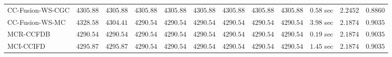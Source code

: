 \begin{table}[H]
\begin{tabular}{lrrrrrrrrrrr}
    CC-Fusion-WS-CGC & $      4305.88$ & $      4305.88$ & $      4305.88$ & $      4305.88$ & $      4305.88$ & $      4305.88$ & $      4305.88$ & $      4305.88$ & $         0.58$ sec    & $       2.2452$  & $       0.8860$ \\ 
     CC-Fusion-WS-MC & $      4328.58$ & $      4304.41$ & $      4290.54$ & $      4290.54$ & $      4290.54$ & $      4290.54$ & $      4290.54$ & $      4290.54$ & $         3.98$ sec    & $       2.1874$  & $       0.9035$ \\ 
\cmidrule{1-1} 
           MCR-CCFDB & $      4290.54$ & $      4290.54$ & $      4290.54$ & $      4290.54$ & $      4290.54$ & $      4290.54$ & $      4290.54$ & $      4290.54$ & $         0.19$ sec    & $       2.1874$  & $       0.9035$ \\ 
\cmidrule{1-1} 
           MCI-CCIFD & $      4295.87$ & $      4295.87$ & $      4290.54$ & $      4290.54$ & $      4290.54$ & $      4290.54$ & $      4290.54$ & $      4290.54$ & $         1.45$ sec    & $       2.1874$  & $       0.9035$ \\ 
\bottomrule
\end{tabular}
\end{table}

